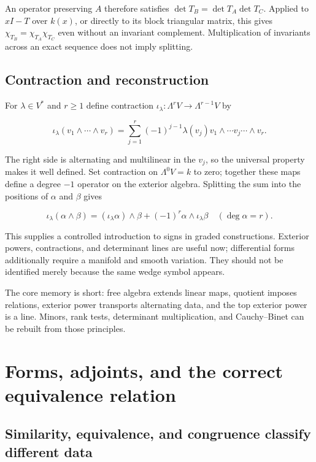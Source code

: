 \documentclass[
  11pt,
]{article}
\begin{document}
An operator preserving \(A\) therefore satisfies
\(\det T_B=\det T_A\det T_C\). Applied to \(xI-T\) over \(k(x)\), or
directly to its block triangular matrix, this gives
\(\chi_{T_B}=\chi_{T_A}\chi_{T_C}\) even without an invariant
complement. Multiplication of invariants across an exact sequence does
not imply splitting.

\subsection{Contraction and
reconstruction}\label{contraction-and-reconstruction}

For \(\lambda\in V^*\) and \(r\ge1\) define contraction
\(\iota_\lambda:\Lambda^rV\to\Lambda^{r-1}V\) by

\[\iota_\lambda(v_1\wedge\cdots\wedge v_r)
=\sum_{j=1}^r(-1)^{j-1}\lambda(v_j)
v_1\wedge\cdots\widehat v_j\cdots\wedge v_r.\]

The right side is alternating and multilinear in the \(v_j\), so the
universal property makes it well defined. Set contraction on
\(\Lambda^0V=k\) to zero; together these maps define a degree \(-1\)
operator on the exterior algebra. Splitting the sum into the positions
of \(\alpha\) and \(\beta\) gives

\[\iota_\lambda(\alpha\wedge\beta)
=(\iota_\lambda\alpha)\wedge\beta
+(-1)^r\alpha\wedge\iota_\lambda\beta
\quad(\deg\alpha=r).\]

This supplies a controlled introduction to signs in graded
constructions. Exterior powers, contractions, and determinant lines are
useful now; differential forms additionally require a manifold and
smooth variation. They should not be identified merely because the same
wedge symbol appears.

The core memory is short: free algebra extends linear maps, quotient
imposes relations, exterior power transports alternating data, and the
top exterior power is a line. Minors, rank tests, determinant
multiplication, and Cauchy--Binet can be rebuilt from those principles.

\section{Forms, adjoints, and the correct equivalence
relation}\label{forms-adjoints-and-the-correct-equivalence-relation}

\subsection{Similarity, equivalence, and congruence classify different
data}\label{similarity-equivalence-and-congruence-classify-different-data}
\end{document}
